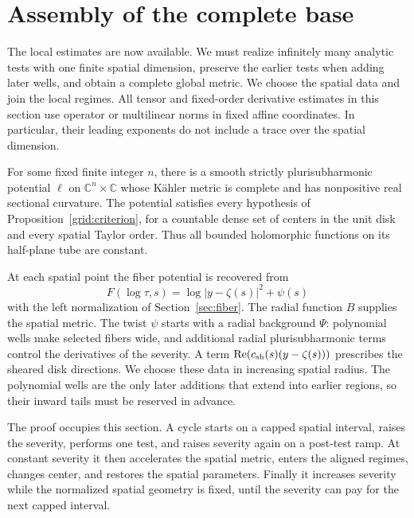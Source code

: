 \section{Assembly of the complete base}\label{sec:assembly}\label{assembly:section}

The local estimates are now available. We must realize infinitely many
analytic tests with one finite spatial dimension, preserve the earlier
tests when adding later wells, and obtain a complete global metric.
We choose the spatial data and join the local regimes. All tensor and
fixed-order derivative estimates in this section use operator or
multilinear norms in fixed affine coordinates. In particular, their
leading exponents do not include a trace over the spatial dimension.

\begin{proposition}\label{assembly:base}
For some fixed finite integer $n$, there is a smooth strictly
plurisubharmonic potential $\ell$ on $\mathbb C^n\times\mathbb C$
whose K\"ahler metric is complete and has nonpositive real sectional
curvature. The potential satisfies every hypothesis of
Proposition~\ref{grid:criterion}, for a countable dense set of centers
in the unit disk and every spatial Taylor order. Thus all bounded
holomorphic functions on its half-plane tube are constant.
\end{proposition}

At each spatial point the fiber potential is recovered from
\[
 F(\log\tau,s)=\log|y-\zeta(s)|^2+\psi(s)
\]
with the left normalization of Section~\ref{sec:fiber}. The radial
function $B$ supplies the spatial metric. The twist $\psi$ starts with
a radial background $\Psi$: polynomial wells make selected fibers wide,
and additional radial plurisubharmonic terms control the derivatives
of the severity. A term
$\operatorname{Re}(c_{\rm sh}(s)(y-\zeta(s)))$ prescribes the sheared
disk directions. We choose these data in increasing spatial radius.
The polynomial wells are the only later additions that extend into
earlier regions, so their inward tails must be reserved in advance.

The proof occupies this section. A cycle starts on a capped spatial
interval, raises the severity, performs one test, and raises severity
again on a post-test ramp. At constant severity it then accelerates the
spatial metric, enters the aligned regimes, changes center, and restores
the spatial parameters. Finally it increases severity while the
normalized spatial geometry is fixed, until the severity can pay for
the next capped interval.


